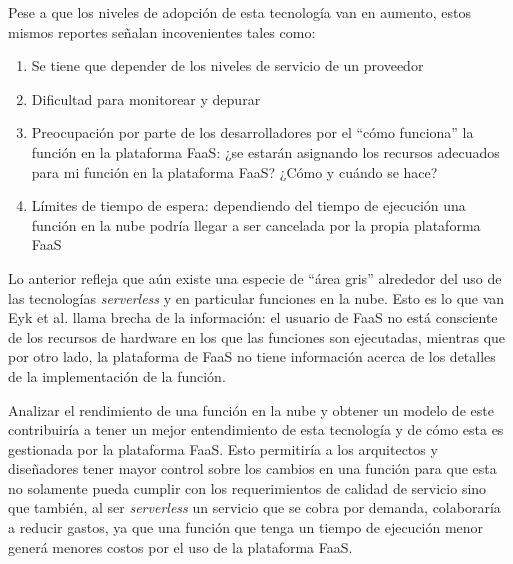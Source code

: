 Pese a que los niveles de adopción de esta tecnología van en aumento, estos mismos reportes señalan incovenientes tales como:
\begin{enumerate}
    \item Se tiene que depender de los niveles de servicio de un proveedor
    \item Dificultad para monitorear y depurar
    \item Preocupación por parte de los desarrolladores por el ``cómo funciona'' la función en la plataforma FaaS: ¿se estarán asignando los recursos adecuados para mi función en la plataforma FaaS? ¿Cómo y cuándo se hace?
    \item Límites de tiempo de espera: dependiendo del tiempo de ejecución una función en la nube podría llegar a ser cancelada por la propia plataforma FaaS
\end{enumerate}

Lo anterior refleja que aún existe una especie de ``área gris'' alrededor del uso de las tecnologías \emph{serverless} y en particular funciones en la nube. Esto es lo que van Eyk et al.\cite{vanEyk:2018:SRC:3185768.3186308} llama brecha de la información: el usuario de FaaS no está consciente de los recursos de hardware en los que las funciones son ejecutadas, mientras que por otro lado, la plataforma de FaaS no tiene información acerca de los detalles de la implementación de la función.

Analizar el rendimiento de una función en la nube y obtener un modelo de este contribuiría a tener un mejor entendimiento de esta tecnología y de cómo esta es gestionada por la plataforma FaaS. Esto permitiría a los arquitectos y diseñadores tener mayor control sobre los cambios en una función para que esta no solamente pueda cumplir con los requerimientos de calidad de servicio sino que también, al ser \emph{serverless} un servicio que se cobra por demanda, colaboraría a reducir gastos, ya que una función que tenga un tiempo de ejecución menor generá menores costos por el uso de la plataforma FaaS.


